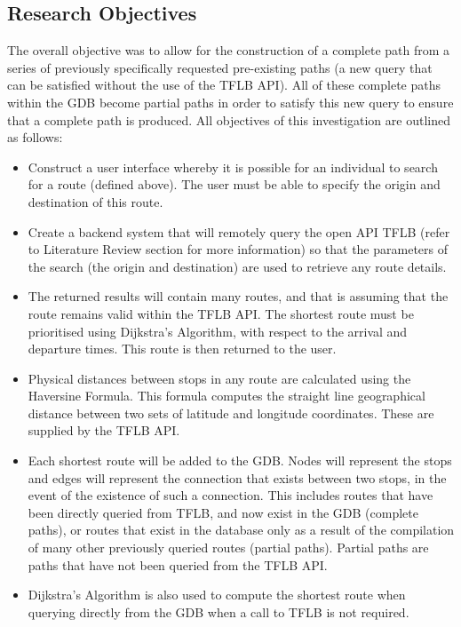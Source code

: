 \documentclass[12pt]{article}   	%
\begin{document}
\newpage

\subsection{Research Objectives}
The overall objective was to allow for the construction of a complete path from a series of previously specifically requested pre-existing paths (a new query that can be satisfied without the use of the TFLB API). All of these complete paths within the GDB become partial paths in order to satisfy this new query to ensure that a complete path is produced. All objectives of this investigation are outlined as follows:

\begin{itemize}
	\item Construct a user interface whereby it is possible for an individual to search for a route (defined above). The user must be able to specify the origin and destination of this route.
	\item Create a backend system that will remotely query the open API TFLB (refer to Literature Review section for more information) so that the parameters of the search (the origin and destination) are used to retrieve any route details.
	\item The returned results will contain many routes, and that is assuming that the route remains valid within the TFLB API. The shortest route must be prioritised using Dijkstra’s Algorithm, with respect to the arrival and departure times. This route is then returned to the user.
	\item Physical distances between stops in any route are calculated using the Haversine Formula. This formula computes the straight line geographical distance between two sets of latitude and longitude coordinates. These are supplied by the TFLB API.
	\item Each shortest route will be added to the GDB. Nodes will represent the stops and edges will represent the connection that exists between two stops, in the event of the existence of such a connection. This includes routes that have been directly queried from TFLB, and now exist in the GDB (complete paths), or routes that exist in the database only as a result of the compilation of many other previously queried routes (partial paths). Partial paths are paths that have not been queried from the TFLB API.
	\item Dijkstra’s Algorithm is also used to compute the shortest route when querying directly from the GDB when a call to TFLB is not required.

\end{itemize}
\end{document}
